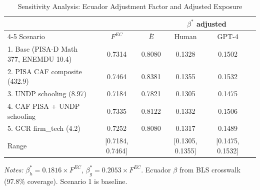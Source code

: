 \begin{table}[htbp]
\centering
\caption{Sensitivity Analysis: Ecuador Adjustment Factor and Adjusted Exposure}
\label{tab:sensitivity}
\small
\begin{tabular}{lccccc}
\toprule
 & & & \multicolumn{2}{c}{$\beta^*$ adjusted} \\
\cmidrule(lr){4-5}
Scenario & $F^{EC}$ & $\overline{E}$ & Human & GPT-4 \\
\midrule
1. Base (PISA-D Math 377, ENEMDU 10.4) & 0.7314 & 0.8080 & 0.1328 & 0.1502 \\
2. PISA CAF composite (432.9) & 0.7464 & 0.8381 & 0.1355 & 0.1532 \\
3. UNDP schooling (8.97) & 0.7184 & 0.7821 & 0.1305 & 0.1475 \\
4. CAF PISA + UNDP schooling & 0.7335 & 0.8122 & 0.1332 & 0.1506 \\
5. GCR firm_tech (4.2) & 0.7252 & 0.8080 & 0.1317 & 0.1489 \\
\midrule
Range & [0.7184, 0.7464] & & [0.1305, 0.1355] & [0.1475, 0.1532] \\
\bottomrule
\end{tabular}
\vspace{2mm}
\begin{minipage}{\textwidth}
\footnotesize
\textit{Notes:} $\beta^*_h = 0.1816 \times F^{EC}$, $\beta^*_g = 0.2053 \times F^{EC}$. Ecuador $\beta$ from BLS crosswalk (97.8\% coverage). Scenario 1 is baseline.
\end{minipage}
\end{table}